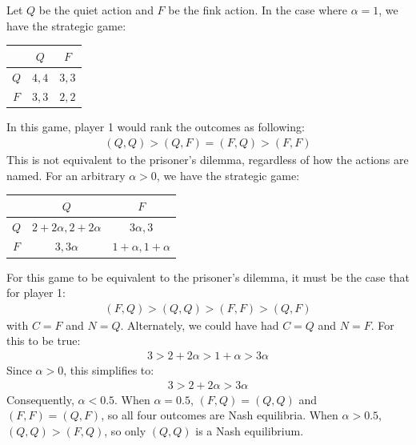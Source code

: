 \documentclass{article}
\begin{document}
\clearpage
\problem{}
Let $Q$ be the quiet action and $F$ be the fink action. In the case where $\alpha = 1$, we have the strategic game:
\begin{center}
\begin{tabular}{|c|c|c|}
    \hline
     & $Q$ & $F$ \\
     \hline
     $Q$ & $4, 4$ & $3, 3$ \\
     \hline
     $F$ & $3, 3$ & $2, 2$ \\
     \hline
\end{tabular}
\end{center}
In this game, player 1 would rank the outcomes as following:
\begin{align*}
    (Q, Q) > (Q, F) = (F, Q) > (F, F)
\end{align*}
This is not equivalent to the prisoner's dilemma, regardless of how the actions are named.
For an arbitrary $\alpha > 0$, we have the strategic game:
\begin{center}
\begin{tabular}{|c|c|c|}
    \hline
     & $Q$ & $F$ \\
     \hline
     $Q$ & $2 + 2\alpha, 2 + 2\alpha$ & $3\alpha, 3$ \\
     \hline
     $F$ & $3, 3\alpha$ & $1 + \alpha, 1 + \alpha$ \\
     \hline
\end{tabular}
\end{center}
For this game to be equivalent to the prisoner's dilemma, it must be the case that for player 1:
\begin{align*}
    (F, Q) > (Q, Q) > (F, F) > (Q, F)
\end{align*}
with $C = F$ and $N = Q$. Alternately, we could have had $C = Q$ and $N = F$. For this to be true:
\begin{align*}
    3 > 2 + 2\alpha > 1 + \alpha > 3\alpha
\end{align*}
Since $\alpha > 0$, this simplifies to:
\begin{align*}
    3 > 2 + 2\alpha > 3\alpha
\end{align*}
Consequently, $\alpha < 0.5$. When $\alpha = 0.5$, $(F, Q) = (Q, Q)$ and $(F, F) = (Q, F)$, so all four outcomes are Nash equilibria. When $\alpha > 0.5$, $(Q, Q) > (F, Q)$, so only $(Q, Q)$ is a Nash equilibrium.
\end{document}
